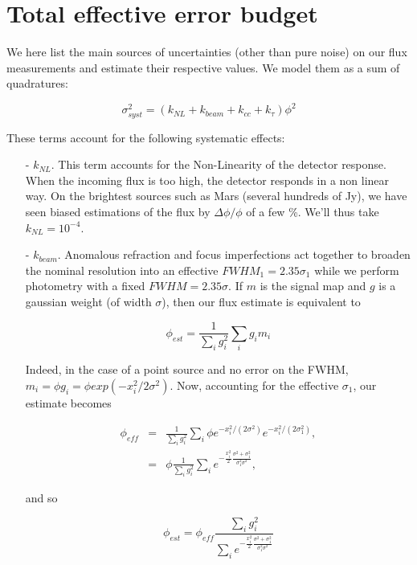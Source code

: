 
\section{Total effective error budget}

We here list the main sources of uncertainties (other than pure noise) on our flux measurements and
estimate their respective values. We model them as a sum of quadratures:

\begin{equation}
\sigma_{syst}^2 = (k_{NL} + k_{beam} + k_{cc} + k_\tau)\phi^2
\end{equation}

These terms account for the following systematic effects:

\begin{itemize}
\item[-] $k_{NL}$. This term accounts for the Non-Linearity of the detector response. When the incoming flux is too
  high, the detector responds in a non linear way. On the brightest sources
  such as Mars (several hundreds of Jy), we have seen biased estimations of the
  flux by $\Delta\phi/\phi$ of a few \%. We'll thus take $k_{NL}=10^{-4}$.
\item[-] $k_{beam}$. Anomalous refraction and focus imperfections act together to
  broaden the nominal resolution into an effective $FWHM_1 = 2.35\sigma_1$ while we perform
  photometry with a fixed $FWHM=2.35\sigma$. If $m$ is the signal map and $g$ is
  a gaussian weight (of width $\sigma$), then our flux estimate is equivalent to

\begin{equation}
\phi_{est} = \frac{1}{\sum_i g_i^2}\sum_i g_im_i
\end{equation}

Indeed, in the case of a point source and no error on the FWHM, $m_i = \phi
g_i = \phi exp(-x_i^2/2\sigma^2)$. Now, accounting for the effective $\sigma_1$, our estimate becomes

\begin{eqnarray}
\phi_{eff} &= & \frac{1}{\sum_i g_i^2}\sum_i \phi e^{-x_i^2/(2\sigma^2)}
e^{-x_i^2/(2\sigma_1^2)}, \nonumber \\
 &=&\phi\frac{1}{\sum_i g_i^2}\sum_i e^{-\frac{x_i^2}{2}\frac{\sigma^2+\sigma_1^2}{\sigma_1^2\sigma^2}},
\end{eqnarray}

and so

\begin{equation}
\phi_{est} = \phi_{eff}\frac{\sum_i g_i^2}{\sum_i
  e^{-\frac{x_i^2}{2}\frac{\sigma^2+\sigma_1^2}{\sigma_1^2\sigma^2}}}
\end{equation}


\end{itemize}
